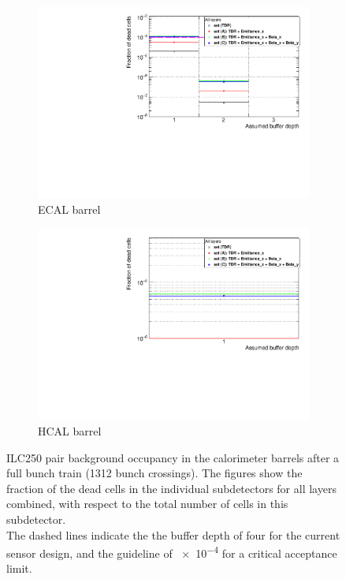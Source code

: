 \begin{figure}[!htbp]
 \centering
  \begin{subfigure}[b]{0.49\textwidth}
   \centering
    \includegraphics[width=\textwidth]{Figures/Pairs/Appendix/Occupancy_Comparison_All_layers_deadcells_ILC250_ALL_SETS_ECALBarrel.pdf}
   \caption{\sid ECAL barrel}
   \end{subfigure}
   \hfill
     \begin{subfigure}[b]{0.49\textwidth}
   \centering
    \includegraphics[width=\textwidth]
    {Figures/Pairs/Appendix/Occupancy_Comparison_All_layers_deadcells_ILC250_ALL_SETS_HcalBarrel.pdf}
   \caption{\sid HCAL barrel}
   \end{subfigure}
   \caption[Pair background occupancy in the \sid calorimater barrels for the ILC250]{ILC250 pair background occupancy in the \sid calorimeter barrels after a full bunch train (1312 bunch crossings).
   The figures show the fraction of the dead cells in the individual subdetectors for all layers combined, with respect to the total number of cells in this subdetector.
   \\The dashed lines indicate the the buffer depth of four for the current sensor design, and the guideline of \num{e-4} for a critical acceptance limit.
   }
   \label{fig:PairBkg:ILC250_Occupancy_Further_detectors}
\end{figure}

